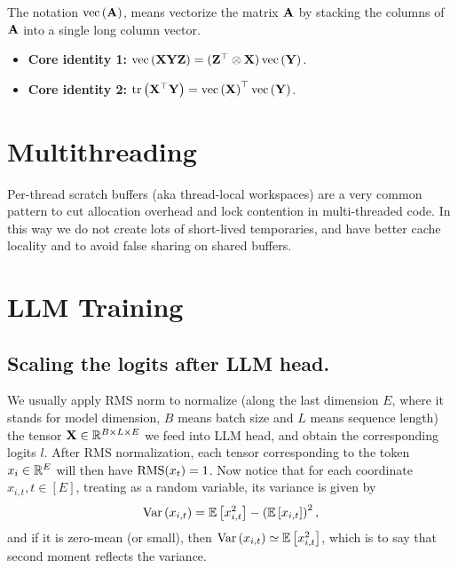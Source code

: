 \documentclass[11pt]{article}  %
\begin{document}
The notation $\text{vec}\left( \mathbf{A} \right)$, means vectorize the matrix $\mathbf{A}$ by stacking the columns of $\mathbf{A}$ into a single long column vector.

\begin{itemize}
  \item \textbf{Core identity 1:} $\text{vec}\left( \mathbf{X}\mathbf{Y}\mathbf{Z} \right) = (\mathbf{Z}^{\top} \otimes \mathbf{X}) \, \text{vec}\left( \mathbf{Y} \right)$.
  \item \textbf{Core identity 2:} $\mathrm{tr}\left(\mathbf{X}^{\top}\mathbf{Y}\right) = \text{vec}\left( \mathbf{X} \right)^{\top}\text{vec}\left( \mathbf{Y} \right)$.
\end{itemize}



\section{Multithreading}
Per-thread scratch buffers (aka thread-local workspaces) are a very common pattern to cut allocation overhead and lock contention in multi-threaded code.
In this way we do not create lots of short-lived temporaries, and have better cache locality and to avoid false sharing on shared buffers.


\section{LLM Training}
\subsection{Scaling the logits after LLM head.}
We usually apply RMS norm to normalize (along the last dimension $E$, where it stands for model dimension, $B$ means batch size and $L$ means sequence length) the tensor $\mathbf{X} \in \mathbb{R}^{B \times L \times E}$ we feed into LLM head, and obtain the corresponding logits $l$.
After RMS normalization, each tensor corresponding to the token $x_i \in \mathbb{R}^E$ will then have ${\rm RMS}(x_t) = 1$.
Now notice that for each coordinate $x_{i, t}, t\in[E]$, treating as a random variable, its variance is given by 
\begin{align}
  \operatorname{Var}\left( x_{i, t} \right) = \mathbb{E}\left[x^2_{i, t}\right] - \left( \mathbb{E}\left[x_{i, t}\right] \right)^2,
\end{align}
and if it is zero-mean (or small), then $\operatorname{Var}\left( x_{i, t} \right) \simeq \mathbb{E}\left[x^2_{i, t}\right]$, which is to say that second moment reflects the variance.
\end{document}
